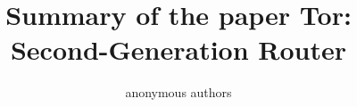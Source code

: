 \documentclass[11pt,twocolumn,a4paper,DIV=calc]{scrartcl}
\begin{document}
\title{Summary of the paper Tor: Second-Generation Router}
\author{anonymous authors}
\date{}
\maketitle


%






 

\end{document}
